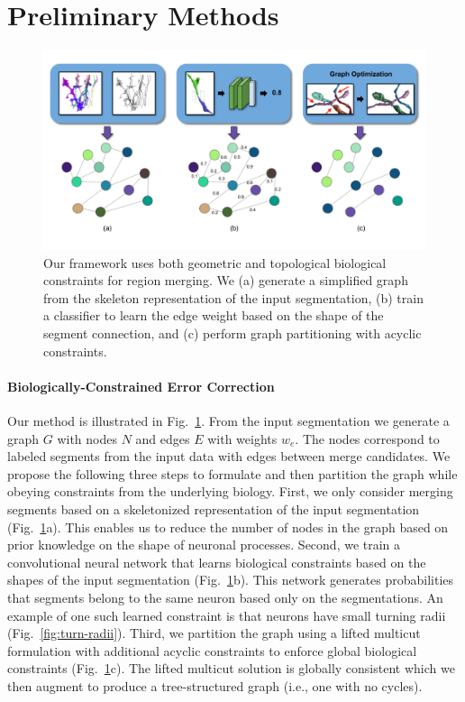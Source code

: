 \section{Preliminary Methods}
\begin{figure}[t!]
	\centering
	\includegraphics[width=\linewidth]{./figures/teaser_v4.png}
	\caption{Our framework uses both geometric and topological biological constraints for region merging. We (a) generate a simplified graph from the skeleton representation of the input segmentation, (b) train a classifier to learn the edge weight based on the shape of the segment connection, and (c) perform graph partitioning with acyclic constraints.}
	\label{fig:teaser_pipeline}
\end{figure}

\paragraph{Biologically-Constrained Error Correction}

Our method is illustrated in Fig.~\ref{fig:teaser_pipeline}.
From the input segmentation we generate a graph $G$ with nodes $N$ and edges $E$ with weights $w_e$. 
The nodes correspond to labeled segments from the input data with edges between merge candidates.
We propose the following three steps to formulate and then partition the graph while obeying constraints from the underlying biology.
First, we only consider merging segments based on a skeletonized representation of the input segmentation (Fig.~\ref{fig:teaser_pipeline}a).
This enables us to reduce the number of nodes in the graph based on prior knowledge on the shape of neuronal processes.
Second, we train a convolutional neural network that learns biological constraints based on the shapes of the input segmentation (Fig.~\ref{fig:teaser_pipeline}b).
This network generates probabilities that segments belong to the same neuron based only on the segmentations. 
An example of one such learned constraint is that neurons have small turning radii (Fig.~\ref{fig:turn-radii}).
Third, we partition the graph using a lifted multicut formulation with additional acyclic constraints to enforce global biological constraints (Fig.~\ref{fig:teaser_pipeline}c).
The lifted multicut solution is globally consistent which we then augment to produce a tree-structured graph (i.e., one with no cycles).

